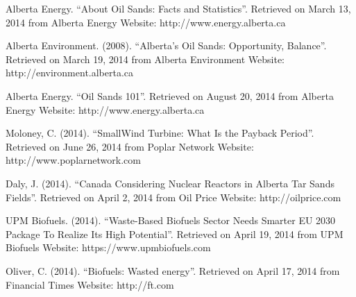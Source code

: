 \documentclass[11pt]{article}
\begin{document}
\begin{thebibliography}{9}
 Alberta Energy. ``About Oil Sands: Facts and Statistics''. Retrieved on March 13, 2014 from Alberta Energy Website: http://www.energy.alberta.ca
 
  Alberta Environment. (2008). ``Alberta's Oil Sands: Opportunity, Balance''. Retrieved on March 19, 2014 from Alberta Environment Website: http://environment.alberta.ca
 
 Alberta Energy. ``Oil Sands 101''. Retrieved on August 20, 2014 from Alberta Energy Website: http://www.energy.alberta.ca

 Moloney, C. (2014). ``SmallWind Turbine: What Is the Payback Period''. Retrieved on June 26, 2014 from Poplar Network Website: http://www.poplarnetwork.com
 
 Daly, J. (2014). ``Canada Considering Nuclear Reactors in Alberta Tar Sands Fields''. Retrieved on April 2, 2014 from Oil Price Website: http://oilprice.com
 
 UPM Biofuels. (2014). ``Waste-Based Biofuels Sector Needs Smarter EU 2030 Package To Realize Its High Potential''. Retrieved on April 19, 2014 from UPM Biofuels Website: https://www.upmbiofuels.com
 
 Oliver, C. (2014). ``Biofuels: Wasted energy''. Retrieved on April 17, 2014 from Financial Times Website: http://ft.com	

\end{thebibliography}
\end{document}
